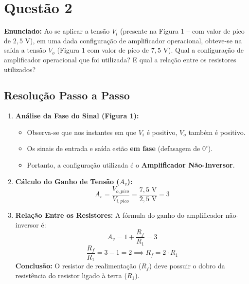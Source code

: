 \section*{Questão 2}
\textbf{Enunciado:} Ao se aplicar a tensão $V_i$ (presente na Figura 1 -- com valor de pico de $2{,}5\text{ V}$), em uma dada configuração de amplificador operacional, obteve-se na saída a tensão $V_o$ (Figura 1 com valor de pico de $7{,}5\text{ V}$). Qual a configuração de amplificador operacional que foi utilizada? E qual a relação entre os resistores utilizados?

\subsection*{Resolução Passo a Passo}
\begin{enumerate}
    \item \textbf{Análise da Fase do Sinal (Figura 1):}
    \begin{itemize}
        \item Observa-se que nos instantes em que $V_i$ é positivo, $V_o$ também é positivo.
        \item Os sinais de entrada e saída estão \textbf{em fase} (defasagem de $0^\circ$).
        \item Portanto, a configuração utilizada é o \textbf{Amplificador Não-Inversor}.
    \end{itemize}

    \item \textbf{Cálculo do Ganho de Tensão ($A_v$):}
    \begin{equation*}
        A_v = \frac{V_{o,pico}}{V_{i,pico}} = \frac{7{,}5\text{ V}}{2{,}5\text{ V}} = 3
    \end{equation*}

    \item \textbf{Relação Entre os Resistores:}
    A fórmula do ganho do amplificador não-inversor é:
    \begin{equation*}
        A_v = 1 + \frac{R_f}{R_1} = 3
    \end{equation*}
    \begin{equation*}
        \frac{R_f}{R_1} = 3 - 1 = 2 \implies R_f = 2 \cdot R_1
    \end{equation*}
    \textbf{Conclusão:} O resistor de realimentação ($R_f$) deve possuir o dobro da resistência do resistor ligado à terra ($R_1$).
\end{enumerate}



